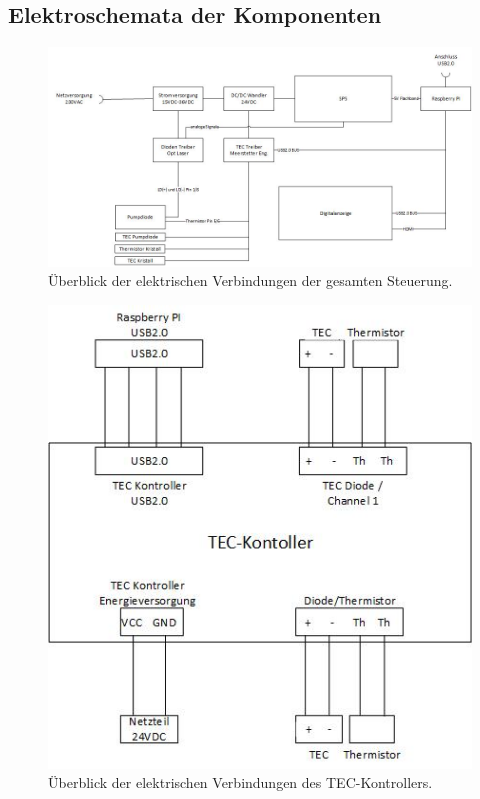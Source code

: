 \begin{appendix}
\subsection{Elektroschemata der Komponenten}

\begin{figure}[H]
    \centering
    \includegraphics[scale=0.8, angle=90]{98_images/fhnw_pro6m_el_schema_overview.jpg}
    \caption{Überblick der elektrischen Verbindungen der gesamten Steuerung.}
    \label{fig:electric_overview}
\end{figure}

\clearpage

\begin{figure}[H]
    \centering
    \includegraphics[scale=1.2, angle=90]{98_images/fhnw_pro6m_el_schema_tec.jpg}
    \caption{Überblick der elektrischen Verbindungen des TEC-Kontrollers.}
    \label{fig:electric_tec}
\end{figure}


\end{appendix}

